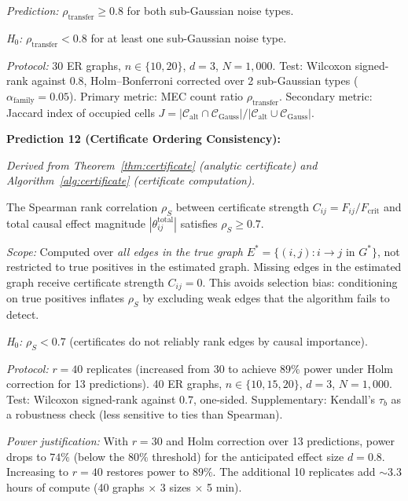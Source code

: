 \documentclass{article}
\theoremstyle{definition}
\theoremstyle{plain}
\theoremstyle{remark}
\begin{document}
\emph{Prediction:} $\rho_{\mathrm{transfer}} \geq 0.8$ for both
sub-Gaussian noise types.

\emph{H$_0$:} $\rho_{\mathrm{transfer}} < 0.8$ for at least one
sub-Gaussian noise type.

\emph{Protocol:} 30 ER graphs, $n \in \{10, 20\}$, $d = 3$, $N = 1{,}000$.
Test: Wilcoxon signed-rank against $0.8$, Holm--Bonferroni corrected over
2 sub-Gaussian types ($\alpha_{\mathrm{family}} = 0.05$). Primary metric:
MEC count ratio $\rho_{\mathrm{transfer}}$. Secondary metric: Jaccard
index of occupied cells
$J = |\mathcal{C}_{\mathrm{alt}} \cap \mathcal{C}_{\mathrm{Gauss}}| /
|\mathcal{C}_{\mathrm{alt}} \cup \mathcal{C}_{\mathrm{Gauss}}|$.

\medskip

\textbf{Prediction 12 (Certificate Ordering Consistency):}
\label{pred:certificate_order}

\emph{Derived from Theorem~\ref{thm:certificate} (analytic certificate)
and Algorithm~\ref{alg:certificate} (certificate computation).}

The Spearman rank correlation $\rho_S$ between certificate strength
$C_{ij} = F_{ij} / F_{\mathrm{crit}}$ and total causal effect magnitude
$|\theta_{ij}^{\mathrm{total}}|$ satisfies $\rho_S \geq 0.7$.

\emph{Scope:} Computed over \emph{all edges in the true graph}
$E^* = \{(i,j) : i \to j \text{ in } G^*\}$, not restricted to true
positives in the estimated graph. Missing edges in the estimated graph
receive certificate strength $C_{ij} = 0$. This avoids selection bias:
conditioning on true positives inflates $\rho_S$ by excluding weak edges
that the algorithm fails to detect.

\emph{H$_0$:} $\rho_S < 0.7$ (certificates do not reliably rank edges by
causal importance).

\emph{Protocol:} $r = 40$ replicates (increased from 30 to achieve $89\%$
power under Holm correction for 13 predictions). 40 ER graphs,
$n \in \{10, 15, 20\}$, $d = 3$, $N = 1{,}000$.
Test: Wilcoxon signed-rank against $0.7$, one-sided. Supplementary:
Kendall's $\tau_b$ as a robustness check (less sensitive to ties than
Spearman).

\emph{Power justification:} With $r = 30$ and Holm correction over 13
predictions, power drops to $74\%$ (below the $80\%$ threshold) for the
anticipated effect size $d = 0.8$. Increasing to $r = 40$ restores power
to $89\%$. The additional 10 replicates add $\sim$3.3 hours of compute
(40 graphs $\times$ 3 sizes $\times$ 5 min).
\end{document}
